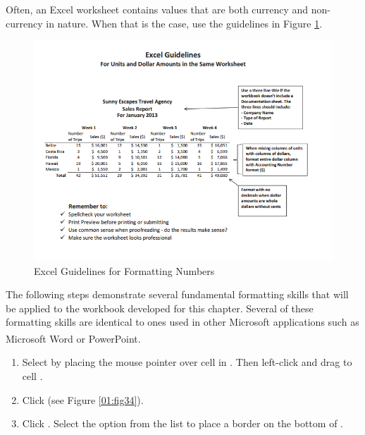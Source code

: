 Often, an Excel worksheet contains values that are both currency and non-currency in nature. When that is the case, use the guidelines in Figure \ref{01:fig33}.

\begin{figure}[H]
	\centering
	\includegraphics[width=\maxwidth{.95\linewidth}]{gfx/ch01_fig33}
	\caption{Excel Guidelines for Formatting Numbers}
	\label{01:fig33}
\end{figure}

The following steps demonstrate several fundamental formatting skills that will be applied to the workbook developed for this chapter. Several of these formatting skills are identical to ones used in other Microsoft applications such as Microsoft\textsuperscript{\textregistered} Word\textsuperscript{\textregistered} or  PowerPoint\textsuperscript{\textregistered}.

\begin{enumbox}
	\begin{enumerate}
		\item Select  by placing the mouse pointer over cell  in . Then left-click and drag to cell . 
		\item Click  (see Figure \ref{01:fig34}).
		\item Click . Select the  option from the list to place a border on the bottom of .
	\end{enumerate}
\end{enumbox}

